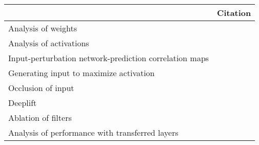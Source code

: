 \begin{tabular}{ll}
\toprule
{} &                                                                                                                                                                                          Citation \\
\midrule
Analysis of weights                                    &  \cite{Perez-Benitez2018, Yoon2018, Langkvist2018, Deiss2018, Lawhern2018, Xu2016, Tsinalis2016a, Nurse2016, Tabar2016a, Zheng2015, Stober2015, Manor2015, Yang2015a, Langkvist2012, Cecotti2011} \\
Analysis of activations                                &                                                                                           \cite{Yuan2018a, Waytowich2018, Lawhern2018, kwak2017, Yin2017a, Supratak2017, Shamwell2016, Manor2015} \\
Input-perturbation network-prediction correlation maps &                                                                                                              \cite{Schirrmeister2017a, Volker2018, Hartmann2018b, Behncke2017, Schirrmeister2017} \\
Generating input to maximize activation                &                                                                                                                                      \cite{VanPutten2018b, Ruffini2018a, Sors2018, Bashivan2016a} \\
Occlusion of input                                     &                                                                                                                                                        \cite{Lee2018, Chambon2018, Thodoroff2016} \\
Deeplift                                               &                                                                                                                                                                                \cite{Lawhern2018} \\
Ablation of filters                                    &                                                                                                                                                                                \cite{Lawhern2018} \\
Analysis of performance with transferred layers        &                                                                                                                                                                            \cite{Hajinoroozi2017} \\

\end{tabular}
